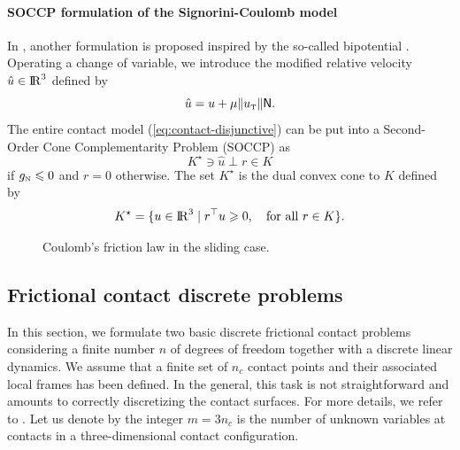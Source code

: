 \paragraph{SOCCP formulation of the Signorini-Coulomb model}

In \cite{Acary.Brogliato2008,Acary.ea_ZAMM2011}, another formulation is proposed inspired by the so-called bipotential \cite{DeSaxce92,DeSaxce.Feng90,DeSaxce.Feng_MCM1998}. Operating a change of variable, we introduce the modified relative velocity $\hat u \in \mathrm{I\!R}^3$ defined by
\begin{equation}
  \label{eq:modified-velocity}
  \hat u = u +\mu \|u_\t\| \sf N.
\end{equation}
The entire contact model (\ref{eq:contact-disjunctive}) can be put into a Second-Order Cone Complementarity Problem (SOCCP) as
\begin{equation}
  \label{eq:contact-SOCCP}
 K^\star \ni \hat u \perp r \in K
\end{equation}
 if $ g_{\hbox{\tiny{N}}} \leqslant 0 $ and $r=0$ otherwise. The set $ K^\star $ is the dual convex cone to $K$ defined by
\begin{equation}
  \label{eq:dual-cone}
  K^\star = \{u \in \RR^3 \mid  r^\top u \geq 0, \quad \text{for all } r \in K   \}.
\end{equation}
\begin{figure}\centering
  \resizebox{!}{0.5\textheight}{}
  \caption{Coulomb's friction law in the sliding case.}
\label{fig:CoulombLawSliding}
\end{figure}




\subsection{Frictional contact discrete problems}

In this section, we formulate two basic discrete frictional contact problems considering a finite number $n$ of degrees of freedom  together with a discrete linear dynamics. We assume that a finite set of $n_c$ contact points and their associated local frames has been defined. In the general, this task is not straightforward and amounts to correctly discretizing  the contact surfaces. For more details, we refer to \cite{Wriggers2006,Laursen2003}. Let us denote by the integer $m = 3 n_c$ is the number of unknown variables at contacts in a three-dimensional contact configuration.

